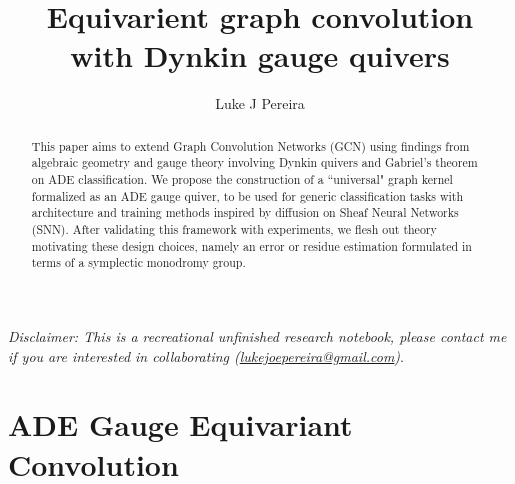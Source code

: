 \documentclass{article}
\title{\vspace{-3cm} Equivarient graph convolution \\with Dynkin gauge quivers  }
\author{Luke J Pereira}
\date{}
\theoremstyle{definition}
\begin{document}
\maketitle
\textit{
Disclaimer: This is a recreational unfinished research notebook, please contact me if you are interested in collaborating (\href{mailto:lukejoepereira@gmail.com}{lukejoepereira@gmail.com})}. \\
\begin{abstract}
\noindent
This paper aims to extend Graph Convolution Networks (GCN) using findings from algebraic geometry and gauge theory involving Dynkin quivers and Gabriel's theorem on ADE classification. We propose the construction of a ``universal" graph kernel formalized as an ADE gauge quiver, to be used for generic classification tasks with architecture and training methods inspired by diffusion on Sheaf Neural Networks (SNN). After validating this framework with experiments, we flesh out theory motivating these design choices, namely an error or residue estimation formulated in terms of a symplectic monodromy group. 

\end{abstract}
\tableofcontents
\newpage


\section{ADE Gauge Equivariant Convolution}
\end{document}
